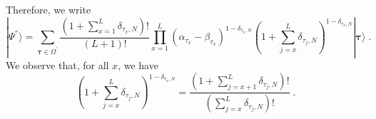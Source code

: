 \documentclass[10pt]{article}
\numberwithin{equation}{section}
\numberwithin{equation}{subsection}
\newcommand{\dt}{\;.}
\begin{document}
Therefore, we write
\begin{equation}\label{resulEsteady}
	|\Psi^{''}\rangle= \sum_{\bm{\tau}\in \Omega^{'}}\frac{(1+\sum_{x=1}^{L}\delta_{\tau_{x},N})!}{(L+1)!}\prod_{x=1}^{L}\left(\alpha_{\tau_{x}}-\beta_{\tau_{x}}\right)^{1-\delta_{\tau_{x},N}}\left(1+\sum_{j=x}^{L}\delta_{\tau_{j},N}\right)^{1-\delta_{\tau_{x},N}}|\bm{\tau}\rangle\dt
\end{equation}
We observe that, for all $x$, we have
\begin{equation}
	\left(1+\sum_{j=x}^{L}\delta_{\tau_{j},N}\right)^{1-\delta_{\tau_{x},N}}=\frac{(1+\sum_{j=x+1}^{L}\delta_{\tau_{j},N})!}{(\sum_{j=x}^{L}\delta_{\tau_{j},N})!}\dt
\end{equation}
\begin{comment}
Using the notation $\tau_{x}$, $|\bm{\tau}\rangle $ with $\bm{\tau}$, related to the one with $\bm{n}$ by \eqref{notation-change-relation}, we have 
\begin{equation}
	\prod_{a=1}^{N-1}\left((\alpha_{a}-\beta_{a})\right)^{n_{a}^{x}}\left(1+\sum_{j=x}^{L}n_{N}^{j}\right)^{n_{a}^{x}}=\left[(\alpha_{\tau_{x}}-\beta_{\tau_{x}})\left(1+\sum_{j=x}^{L}\delta_{\tau_{j},N}\right)\right]^{1-\delta_{\tau_{x},N}}
\end{equation}
and 
\begin{equation}
	\frac{\Gamma(2+\sum_{i=1}^{L}n_{N}^{i})}{\Gamma(L+2)}=\frac{\Gamma\left(2+\sum_{x=1}^{L}\delta_{\tau_{x},N}\right)}{\Gamma\left(2+L\right)}\dt
\end{equation}
Therefore we obtain
\begin{equation}
|\Psi^{''}\rangle=\sum_{\tau_{1},\ldots,\tau_{L}=1}^{N}\frac{\Gamma\left(2+\sum_{x=1}^{L}\delta_{\tau_{x},N}\right)}{\Gamma\left(2+L\right)}\prod_{x=1}^{L}\left[(\alpha_{\tau_{x}}-\beta_{\tau_{x}})\left(1+\sum_{j=x}^{L}\delta_{\tau_{j},N}\right)\right]^{1-\delta_{\tau_{x},N}}|\mathbf{\bm{\tau}}\rangle\dt
\end{equation}

\end{comment}
\end{document}

